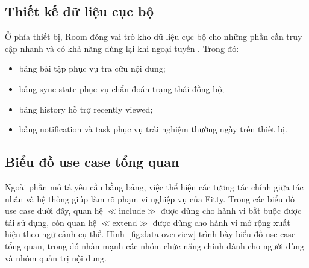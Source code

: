 \subsection{Thiết kế dữ liệu cục bộ}

Ở phía thiết bị, Room đóng vai trò kho dữ liệu cục bộ cho những phần cần truy cập nhanh và có khả năng dùng lại khi ngoại tuyến \cite{android_room}. Trong đó:

\begin{itemize}
    \item bảng bài tập phục vụ tra cứu nội dung;
    \item bảng sync state phục vụ chẩn đoán trạng thái đồng bộ;
    \item bảng history hỗ trợ recently viewed;
    \item bảng notification và task phục vụ trải nghiệm thường ngày trên thiết bị.
\end{itemize}

\subsection{Biểu đồ use case tổng quan}

Ngoài phần mô tả yêu cầu bằng bảng, việc thể hiện các tương tác chính giữa tác nhân và hệ thống giúp làm rõ phạm vi nghiệp vụ của Fitty. Trong các biểu đồ use case dưới đây, quan hệ $\ll$include$\gg$ được dùng cho hành vi bắt buộc được tái sử dụng, còn quan hệ $\ll$extend$\gg$ được dùng cho hành vi mở rộng xuất hiện theo ngữ cảnh cụ thể. Hình~\ref{fig:data-overview} trình bày biểu đồ use case tổng quan, trong đó nhấn mạnh các nhóm chức năng chính dành cho người dùng và nhóm quản trị nội dung.

